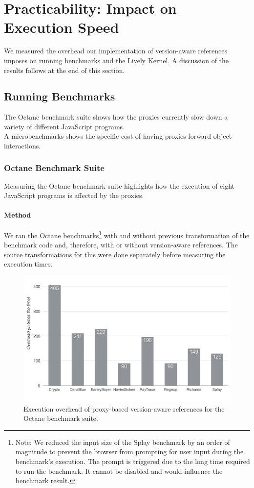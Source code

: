 \section{Practicability: Impact on Execution Speed} \label{sec:EVALUATION:4}

We measured the overhead our implementation of version-aware references imposes on running benchmarks and the Lively Kernel.
A discussion of the results follows at the end of this section.


\subsection{Running Benchmarks}

The Octane benchmark suite shows how the proxies currently slow down a variety of different JavaScript programs.\\
A microbenchmarks shows the specific cost of having proxies forward object interactions.

\subsubsection{Octane Benchmark Suite}

Measuring the Octane benchmark suite highlights how the execution of eight JavaScript programs is affected by the proxies.

\paragraph{Method}
We ran the Octane benchmarks\footnote{Note: We reduced the input size of the Splay benchmark by an order of magnitude to prevent the browser from prompting for user input during the benchmark's execution. The prompt is triggered due to the long time required to run the benchmark. It cannot be disabled and would influence the benchmark result.} with and without previous transformation of the benchmark code and, therefore, with or without version-aware references.
The source transformations for this were done separately before measuring the execution times.

\begin{figure}[h]
    \centering
    \includegraphics[width=\textwidth]{figures/6_evaluation/3_executionOverhead.pdf}
    \caption{Execution overhead of proxy-based version-aware references for the Octane benchmark suite.}
    \label{fig:ExecutionOverhead}
\end{figure}

